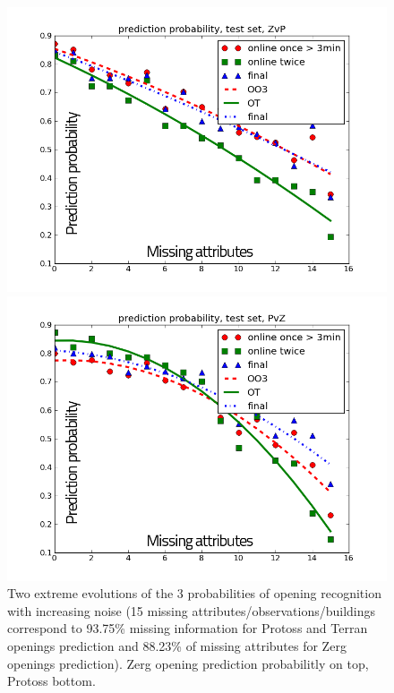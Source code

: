 \begin{figure}[htp]
\centerline{\includegraphics[width=0.7\columnwidth]{images/ZvP2.png}}
\centerline{\includegraphics[width=0.7\columnwidth]{images/PvZ2.png}}
\caption{Two extreme evolutions of the 3 probabilities of opening recognition with increasing noise (15 missing attributes/observations/buildings correspond to 93.75\% missing information for Protoss and Terran openings prediction and 88.23\% of missing attributes for Zerg openings prediction). Zerg opening prediction probabilitly on top, Protoss bottom.}
\label{noise}
\end{figure}

